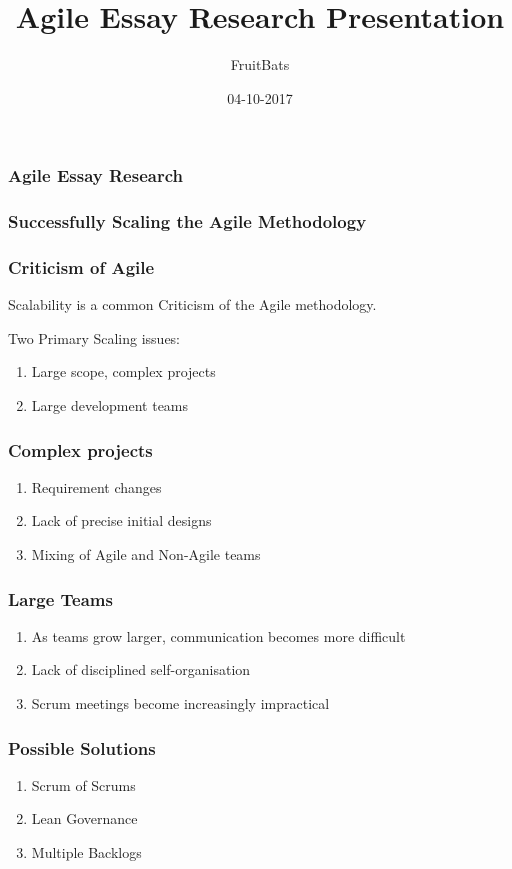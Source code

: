 \documentclass{beamer}
\title{Agile Essay Research Presentation}
\date{04-10-2017}
\author{FruitBats}
\begin{document}
\begin{frame}
	\frametitle{Agile Essay Research}	
\end{frame}



\begin{frame}
	\frametitle{Successfully Scaling the Agile Methodology}	
\end{frame}


\begin{frame}
	\frametitle{Criticism of Agile}
	
	Scalability is a common Criticism of the Agile methodology. 
	
	\vspace{5mm}
	
	Two Primary Scaling issues:	
	\begin{enumerate}
		\item Large scope, complex projects
		\item Large development teams
	\end{enumerate}	
\end{frame}


\begin{frame}
	\frametitle{Complex projects}
	
	\begin{enumerate}
		\item Requirement changes
		\item Lack of precise initial designs
		\item Mixing of Agile and Non-Agile teams
	\end{enumerate}
\end{frame}
	
	
\begin{frame}
	\frametitle{Large Teams}
	
	\begin{enumerate}
		\item As teams grow larger, communication becomes more difficult
		\item Lack of disciplined self-organisation
		\item Scrum meetings become increasingly impractical
	\end{enumerate}
\end{frame}


\begin{frame}
	\frametitle{Possible Solutions}
	
	\begin{enumerate}
		\item Scrum of Scrums	
		\item Lean Governance
		\item Multiple Backlogs
	\end{enumerate}
\end{frame}
\end{document}
